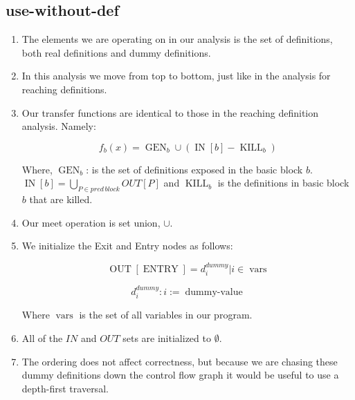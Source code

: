 \documentclass[12pt]{article}
\begin{document}
\subsection{use-without-def}
\begin{enumerate}

\item The elements we are operating on in our analysis is the set of
  definitions, both real definitions and dummy definitions.

\item In this analysis we move from top to bottom, just like in the analysis
  for reaching definitions.

\item Our transfer functions are identical to those in the reaching definition
  analysis. Namely:

  \begin{equation}
    f_b(x) = \operatorname{GEN}_b \cup (\operatorname{IN}[b] - \operatorname{KILL}_b)
  \end{equation}

Where, $\operatorname{GEN}_b$: is the set of definitions exposed in the basic
block $b$. $\operatorname{IN}[b] = \bigcup_{P\in pred\, block}OUT[P]$ and $\operatorname{KILL}_b$ is the
definitions in basic block $b$ that are killed.

\item Our meet operation is set union, $\cup$.

\item We initialize the Exit and Entry nodes as follows:

  \begin{equation}
    \operatorname{OUT}[\operatorname{ENTRY}] = {d^{dummy}_i| i \in
      \operatorname{vars}}
  \end{equation}

  \begin{equation}
    d^{dummy}_i: i := \operatorname{dummy-value}
  \end{equation}

Where $\operatorname{vars}$ is the set of all variables in our program.

\item All of the $IN$ and $OUT$ sets are initialized to $\emptyset$.

\item The ordering does not affect correctness, but because we are chasing
  these dummy definitions down the control flow graph it would be useful to
  use a depth-first traversal.


\end{enumerate}
\end{document}
